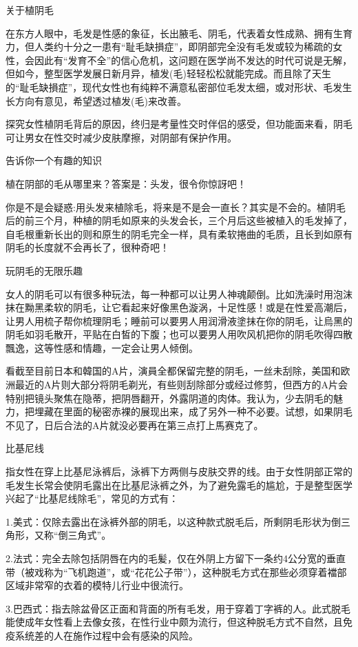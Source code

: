 \documentclass[12pt,UTF8]{ctexbook}
\begin{document}
关于植阴毛

在东方人眼中，毛发是性感的象征，长出腋毛、阴毛，代表着女性成熟、拥有生育力，但人类约十分之一患有“耻毛缺損症”，即阴部完全没有毛发或较为稀疏的女性，会因此有“发育不全”的信心危机，这问题在医学尚不发达的时代可说是无解，但如今，整型医学发展日新月异，植发(毛)轻轻松松就能完成。而且除了天生的“耻毛缺損症”，现代女性也有纯粹不满意私密部位毛发太细，或对形状、毛发生长方向有意见，希望透过植发(毛)来改善。

探究女性植阴毛背后的原因，终归是考量性交时伴侣的感受，但功能面来看，阴毛可让男女在性交时减少皮肤摩擦，对阴部有保护作用。

告诉你一个有趣的知识

植在阴部的毛从哪里来？答案是：头发，很令你惊訝吧！

你是不是会疑惑:用头发来植除毛，将来是不是会一直长？其实是不会的。植阴毛后的前三个月，种植的阴毛如原来的头发会长，三个月后这些被植入的毛发掉了，自毛根重新长出的则和原生的阴毛完全一样，具有柔软捲曲的毛质，且长到如原有阴毛的长度就不会再长了，很种奇吧！

玩阴毛的无限乐趣

女人的阴毛可以有很多种玩法，每一种都可以让男人神魂颠倒。比如洗澡时用泡沫抹在黝黑柔软的阴毛，让它看起来好像黑色漩涡，十足性感！或是在性爱高潮后，让男人用梳子帮你梳理阴毛；睡前可以要男人用润滑液塗抹在你的阴毛，让烏黑的阴毛如羽毛散开，平贴在白皙的下腹；也可以要男人用吹风机把你的阴毛吹得四散飄逸，这等性感和情趣，一定会让男人倾倒。

看截至目前日本和韓国的A片，演員全都保留完整的阴毛，一丝未刮除，美国和欧洲最近的A片则大部分将阴毛剃光，有些则刮除部分或经过修剪，但西方的A片会特别把镜头聚焦在隐蒂，把阴唇翻开，外露阴道的肉体。我认为，少去阴毛的魅力，把埋藏在里面的秘密赤裸的展现出来，成了另外一种不必要。试想，如果阴毛不见了，日后合法的A片就没必要再在第三点打上馬赛克了。

比基尼线

指女性在穿上比基尼泳裤后，泳裤下方两侧与皮肤交界的线。由于女性阴部正常的毛发生长常会使阴毛露出在比基尼泳裤之外，为了避免露毛的尴尬，于是整型医学兴起了“比基尼线除毛”，常见的方式有：

1.美式：仅除去露出在泳裤外部的阴毛，以这种款式脱毛后，所剩阴毛形状为倒三角形，又称“倒三角式”。

2.法式：完全去除包括阴唇在内的毛髪，仅在外阴上方留下一条约4公分宽的垂直带（被戏称为“飞机跑道”，或“花花公子带”），这种脱毛方式在那些必须穿着襠部区域非常窄的衣着的模特儿行业中很流行。

3.巴西式：指去除盆骨区正面和背面的所有毛发，用于穿着丁字裤的人。此式脱毛能使成年女性看上去像女孩，在性行业中颇为流行，但这种脱毛方式不自然，且免疫系统差的人在施作过程中会有感染的风险。
\end{document}
